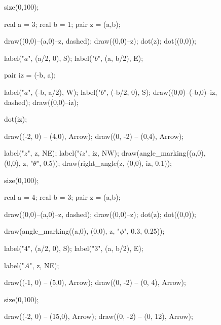 \documentclass[../textbook.tex]{subfiles}
\begin{document}
\begin{figure}[h]
	\begin{center}
		\begin{minipage}[b]{0.25\textwidth}
			\centering
			\begin{asy}[width=\textwidth]
				size(0,100);
				
				real a = 3;
				real b = 1;
				pair z = (a,b);
				
				draw((0,0)--(a,0)--z, dashed);
				draw((0,0)--z);
				dot(z);
				dot((0,0));
				
				label("$a$", (a/2, 0), S);
				label("$b$", (a, b/2), E);
				
				pair iz = (-b, a);
				
				label("$a$", (-b, a/2), W);
				label("$b$", (-b/2, 0), S);
				draw((0,0)--(-b,0)--iz, dashed);
				draw((0,0)--iz);
				
				dot(iz);
				
				draw((-2, 0) -- (4,0), Arrow);
				draw((0, -2) -- (0,4), Arrow);
				
				label("$z$", z, NE);
				label("$iz$", iz, NW);
				draw(angle_marking((a,0), (0,0), z, "$\theta$", 0.5));
				draw(right_angle(z, (0,0), iz, 0.1));
			\end{asy}
		\end{minipage}
		\hfill
		\begin{minipage}[b]{0.25\textwidth}
			\centering
			\begin{asy}[width=\textwidth]
				size(0,100);
				
				real a = 4;
				real b = 3;
				pair z = (a,b);
				
				draw((0,0)--(a,0)--z, dashed);
				draw((0,0)--z);
				dot(z);
				dot((0,0));
				
				draw(angle_marking((a,0), (0,0), z, "$\phi$", 0.3, 0.25));
				
				label("$4$", (a/2, 0), S);
				label("$3$", (a, b/2), E);
				
				label("$A$", z, NE);
				
				draw((-1, 0) -- (5,0), Arrow);
				draw((0, -2) -- (0, 4), Arrow);
			\end{asy}
		\end{minipage}
		\hfill
		\begin{minipage}[b]{0.4\textwidth}
			\centering
			\begin{asy}[width=0.7\textwidth]
				size(0,100);
				
				draw((-2, 0) -- (15,0), Arrow);
				draw((0, -2) -- (0, 12), Arrow);
				

\end{asy}
\end{minipage}
\end{center}
\end{figure}
\end{document}
